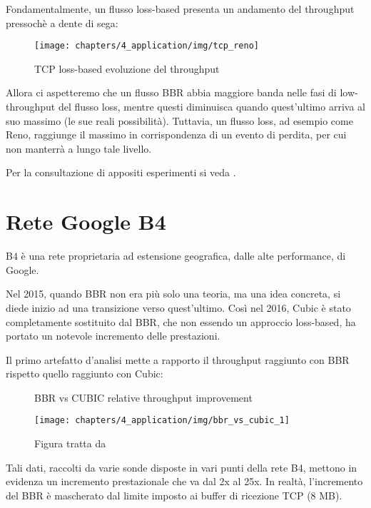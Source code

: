 Fondamentalmente, un flusso loss-based presenta un andamento del throughput pressochè a dente di sega:

\begin{figure}[H]

\center
\caption{TCP loss-based evoluzione del throughput}
\texttt{[image: chapters/4\_application/img/tcp\_reno]}

\end{figure}

Allora ci aspetteremo che un flusso BBR abbia maggiore banda nelle fasi di low-throughput del flusso loss, mentre questi diminuisca quando quest'ultimo arriva al suo massimo (le sue reali possibilità). Tuttavia, un flusso loss, ad esempio come Reno, raggiunge il massimo in corrispondenza di un evento di perdita, per cui non manterrà a lungo tale livello. \bigskip

Per la consultazione di appositi esperimenti si veda \cite{ietf:ietf-98-bbr-slides}. 

\section{Rete Google B4}

B4 è una rete proprietaria ad estensione geografica, dalle alte performance, di Google. \bigskip

Nel 2015, quando BBR non era più solo una teoria, ma una idea concreta, si diede inizio ad una transizione verso quest'ultimo. Così nel 2016, Cubic è stato completamente sostituito dal BBR, che non essendo un approccio loss-based, ha portato un notevole incremento delle prestazioni. \bigskip

Il primo artefatto d'analisi mette a rapporto il throughput raggiunto con BBR rispetto quello raggiunto con Cubic:

\begin{figure}[H]

\center
\caption{BBR vs CUBIC relative throughput improvement}
\texttt{[image: chapters/4\_application/img/bbr\_vs\_cubic\_1]}
\caption*{Figura tratta da \cite[p.~64]{Cardwell:2017:BCC:3042068.3009824}}

\end{figure}

Tali dati, raccolti da varie sonde disposte in vari punti della rete B4, mettono in evidenza un incremento prestazionale che va dal 2x al 25x. In realtà, l'incremento del BBR è mascherato dal limite imposto ai buffer di ricezione TCP (8 MB). \bigskip

